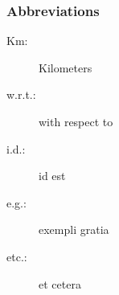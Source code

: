 \subsubsection{Abbreviations}
	\begin{description}
		\item [Km:] Kilometers
		\item [w.r.t.:] with respect to
		\item [i.d.:] id est
		\item [e.g.:] exempli gratia
		\item [etc.:] et cetera
	\end{description}